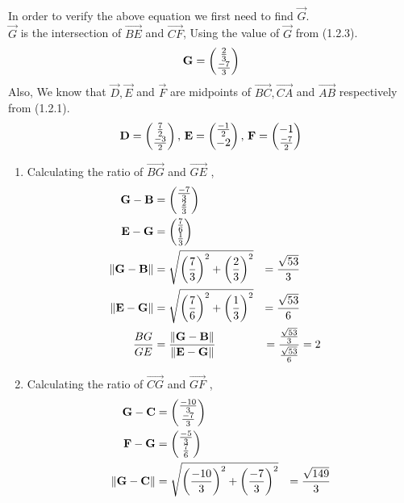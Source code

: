 \documentclass[10pt]{book}
\begin{document}
\begin{enumerate}[label=\thesection.\arabic*.,ref=\thesection.\theenumi]
\solution \\
In order to verify the above equation we first need to find $\vec{G}$.\\
$\vec{G}$ is the intersection of $\vec{BE}$ and $\vec{CF}$, Using the value of $\vec{G}$ from (1.2.3).
\begin{align}
		\mathbf{G} = \begin{pmatrix}\frac{2}{3} \\ \frac{-7}{3}\end{pmatrix}
\end{align}
Also, We know that $\vec{D}, \vec{E}$ and $\vec{F}$ are midpoints of $\vec{BC}, \vec{CA}$ and $\vec{AB}$ respectively from (1.2.1).
\begin{align}
		\mathbf{D} = \begin{pmatrix}\frac{7}{2} \\ \frac{-3}{2}\end{pmatrix},\,
		\mathbf{E} = \begin{pmatrix}\frac{-1}{2} \\ -2\end{pmatrix},\,
		\mathbf{F} = \begin{pmatrix}-1 \\ \frac{-7}{2}\end{pmatrix}
\end{align}
\begin{enumerate}
\item Calculating the ratio of $\vec{BG}$ and $\vec{GE}$ ,
\begin{align}
		\label{eq:tri-pts/4} \vec{G}-\vec{B} &= \myvec{\frac{-7}{3} \\ \frac{2}{3}} \\
		\label{eq:tri-pts/5} \vec{E}-\vec{G} &= \myvec{\frac{7}{6} \\ \frac{1}{3}} \\
		\label{eq:tri-pts/6} \norm{\vec{G}-\vec{B}} &= \sqrt{\brak{\frac{7}{3}}^2 + \brak{\frac{2}{3}}^{2}} &= \frac{\sqrt{53}}{3} \\
		\label{eq:tri-pts/7} \norm{\vec{E}-\vec{G}} &= \sqrt{\brak{\frac{7}{6}}^2 + \brak{\frac{1}{3}}^2} &= \frac{\sqrt{53}}{6} \\
		\label{eq:tri-pts/8}\frac{BG}{GE} &= \frac{\norm{\vec{G}-\vec{B}}}{\norm{\vec{E}-\vec{G}}} &= \frac{\frac{\sqrt{53}}{3}}{\frac{\sqrt{53}}{6}} &= 2  
\end{align}		
\item Calculating the ratio of $\vec{CG}$ and $\vec{GF}$ ,
\begin{align}
		\label{eq:tri-pts/9} \vec{G}-\vec{C} &= \myvec{\frac{-10}{3} \\ \frac{-7}{3}} \\
		\label{eq:tri-pts/10} \vec{F}-\vec{G} &= \myvec{\frac{-5}{3} \\ \frac{7}{6}} \\
		\label{eq:tri-pts/11} \norm{\vec{G}-\vec{C}} &= \sqrt{\brak{\frac{-10}{3}}^{2} + \brak{\frac{-7}{3}}^{2}} &= \frac{\sqrt{149}}{3} \\  

\end{align}
\end{enumerate}
\end{enumerate}
\end{document}
